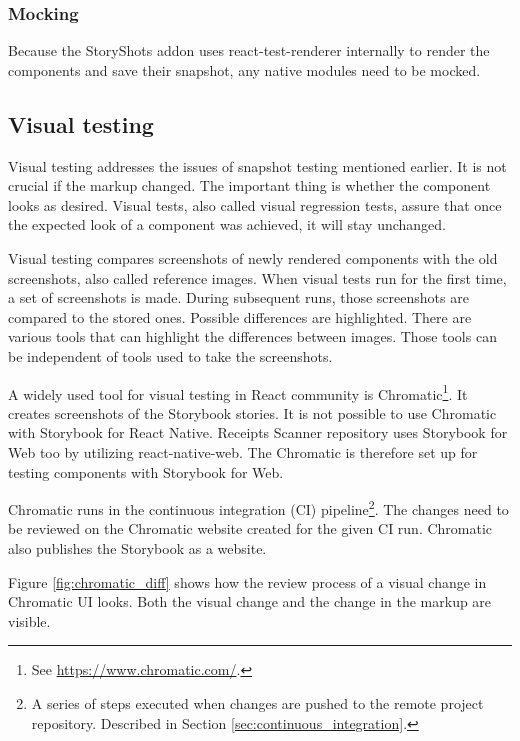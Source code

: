 \documentclass[
  digital, %
  table,   %
  oneside, %
  lof,     %
  lot,     %
]{fithesis3}
\begin{document}
\subsubsection{Mocking}
Because the StoryShots addon uses react-test-renderer internally to render the components and save their snapshot, any native modules need to be mocked.

\subsection{Visual testing}
\label{sec:visual_testing}
Visual testing addresses the issues of snapshot testing mentioned earlier. It is not crucial if the markup changed. The important thing is whether the component looks as desired. Visual tests, also called visual regression tests, assure that once the expected look of a component was achieved, it will stay unchanged.

Visual testing compares screenshots of newly rendered components with the old screenshots, also called reference images.
When visual tests run for the first time, a set of screenshots is made. During subsequent runs, those screenshots are compared to the stored ones. Possible differences are highlighted. There are various tools that can highlight the differences between images. Those tools can be independent of tools used to take the screenshots.

A widely used tool for visual testing in React community is Chromatic\footnote{See \url{https://www.chromatic.com/}.}. It creates screenshots of the Storybook stories. It is not possible to use Chromatic with Storybook for React Native. Receipts Scanner repository uses Storybook for Web too by utilizing react-native-web. The Chromatic is therefore set up for testing components with Storybook for Web.

Chromatic runs in the continuous integration (CI) pipeline\footnote{A series of steps executed when changes are pushed to the remote project repository. Described in Section \ref{sec:continuous_integration}.}. The changes need to be reviewed on the Chromatic website created for the given CI run. Chromatic also publishes the Storybook as a website.

Figure \ref{fig:chromatic_diff} shows how the review process of a visual change in Chromatic UI looks. Both the visual change and the change in the markup are visible.
\end{document}
